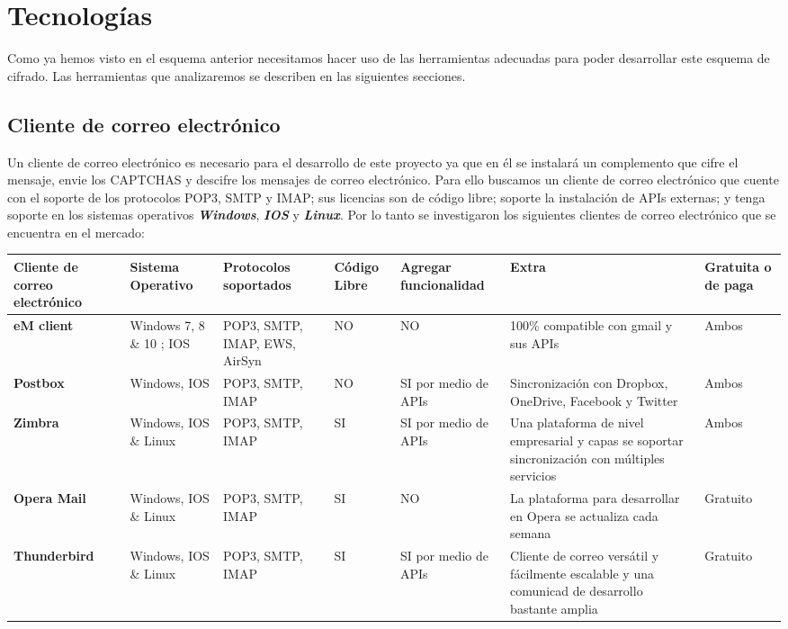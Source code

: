 \documentclass[12pt,oneside,onecolumn,openany]{report}
\begin{document}
\section{Tecnologías}
Como ya hemos visto en el esquema anterior necesitamos hacer uso de las herramientas adecuadas para poder desarrollar este esquema de cifrado. Las herramientas que analizaremos se describen en las siguientes secciones.\\
\subsection{Cliente de correo electrónico}
Un cliente de correo electrónico es necesario para el desarrollo de este proyecto ya que en él se instalará un complemento que cifre el mensaje, envie los CAPTCHAS y descifre los mensajes de correo electrónico. Para ello buscamos un cliente de correo electrónico que cuente con el soporte de los protocolos POP3, SMTP y IMAP; sus licencias son de código libre; soporte la instalación de APIs externas; y tenga soporte en los sistemas operativos \textbf{\textit{Windows}}, \textbf{\textit{IOS}} y \textbf{\textit{Linux}}. Por lo tanto se investigaron los siguientes clientes de correo electrónico que se encuentra en el mercado: \\
\begin{longtable}[H]{| p{} | p{2cm} |p{2cm}|p{}|p{2cm}|p{3cm}|p{2cm}|}%
 \hline
 \textbf{Cliente de correo electrónico}&\textbf{Sistema Operativo}&\textbf{Protocolos soportados}&\textbf{Código Libre}&\textbf{Agregar funcionalidad}&\textbf{Extra}&\textbf{Gratuita o de paga}\\
 \hline
 \textbf{eM client}&Windows 7, 8 \& 10 ; IOS&POP3, SMTP, IMAP, EWS, AirSyn&NO&NO&100\% compatible con gmail y sus APIs&Ambos\\
 \hline
 \textbf{Postbox}&Windows, IOS&POP3, SMTP, IMAP&NO&SI por medio de APIs&Sincronización con Dropbox, OneDrive, Facebook y Twitter&Ambos\\
 \hline
 \textbf{Zimbra}&Windows, IOS \& Linux&POP3, SMTP, IMAP&SI&SI por medio de APIs&Una plataforma de nivel empresarial y capas se soportar sincronización con múltiples servicios&Ambos\\
 \hline
 \textbf{Opera Mail}&Windows, IOS \& Linux&POP3, SMTP, IMAP&SI&NO&La plataforma para desarrollar en Opera se actualiza cada semana&Gratuito\\
 \hline
 \textbf{Thunderbird}&Windows, IOS \& Linux&POP3, SMTP, IMAP&SI&SI por medio de APIs&Cliente de correo versátil y fácilmente escalable y una comunicad de desarrollo bastante amplia&Gratuito\\
\end{longtable}
\end{document}
